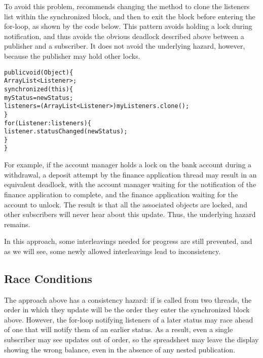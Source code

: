\documentclass{llncs}
\begin{document}
To avoid this problem, \cite{Englander:beans} recommends changing the
 method to clone the listeners list within the
synchronized block, and then to exit the block before entering the
for-loop, as shown by the code below. This pattern avoids holding a
lock during notification, and thus avoids the obvious deadlock
described above between a publisher and a subscriber.  It does not
avoid the underlying hazard, however, because the publisher may hold
other locks.
%
\begin{alltt}
    public void (Object ) \{
        ArrayList<Listener> ;
        synchronized (this) \{
            myStatus = newStatus;
            listeners = (ArrayList<Listener>)myListeners.clone();
        \}
        for (Listener : listeners) \{
            listener.statusChanged(newStatus);
        \}
    \}
\end{alltt}
%
For example, if the account manager holds a lock on the bank account
during a withdrawal, a deposit attempt by the finance application
thread may result in an equivalent deadlock, with the account manager
waiting for the notification of the finance application to complete,
and the finance application waiting for the account to unlock.  The
result is that all the associated objects are locked, and other
subscribers will never hear about this update.  Thus, the underlying
hazard remains.

In this approach, some interleavings needed for progress are still
prevented, and as we will see, some newly allowed interleavings lead
to inconsistency.

\subsection{Race Conditions}

The approach above has a consistency hazard: if  is
called from two threads, the order in which they update 
will be the order they enter the synchronized block above. However,
the for-loop notifying listeners of a later status may race ahead of
one that will notify them of an earlier status. As a result, even a
single subscriber may see updates out of order, so the spreadsheet may
leave the display showing the wrong balance, even in the absence of
any nested publication.
\end{document}
